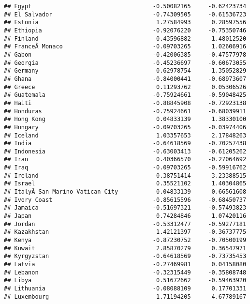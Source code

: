 \documentclass[
]{article}
\begin{document}
\begin{verbatim}
## Egypt                                   -0.50082165     -0.62423734
## El Salvador                             -0.74309505     -0.61536723
## Estonia                                  1.27584993      0.28597556
## Ethiopia                                -0.92076220     -0.75350746
## Finland                                  0.43596882      1.48012520
## FranceÂ Monaco                          -0.09703265      1.02606916
## Gabon                                   -0.42006385     -0.47577978
## Georgia                                 -0.45236697     -0.60673055
## Germany                                  0.62978754      1.35052829
## Ghana                                   -0.84000441     -0.68973607
## Greece                                   0.11293762      0.05306526
## Guatemala                               -0.75924661     -0.59048425
## Haiti                                   -0.88845908     -0.72923138
## Honduras                                -0.75924661     -0.68039911
## Hong Kong                                0.04833139      1.38330100
## Hungary                                 -0.09703265     -0.03974406
## Iceland                                  1.03357653      2.17848263
## India                                   -0.64618569     -0.70257438
## Indonesia                               -0.63003413     -0.61205262
## Iran                                     0.40366570     -0.27064692
## Iraq                                    -0.09703265     -0.59916762
## Ireland                                  0.38751414      3.23388515
## Israel                                   0.35521102      1.40304865
## ItalyÂ San Marino Vatican City           0.04833139      0.66561608
## Ivory Coast                             -0.85615596     -0.68450737
## Jamaica                                 -0.51697321     -0.57493823
## Japan                                    0.74284846      1.07420116
## Jordan                                  -0.53312477     -0.59277181
## Kazakhstan                               1.42121397     -0.36737775
## Kenya                                   -0.87230752     -0.70500199
## Kuwait                                   2.85870279      0.36547971
## Kyrgyzstan                              -0.64618569     -0.73735453
## Latvia                                  -0.27469981      0.04158080
## Lebanon                                 -0.32315449     -0.35808748
## Libya                                    0.51672662     -0.59463920
## Lithuania                               -0.08088109      0.17701331
## Luxembourg                               1.71194205      4.67789167

\end{verbatim}
\end{document}
